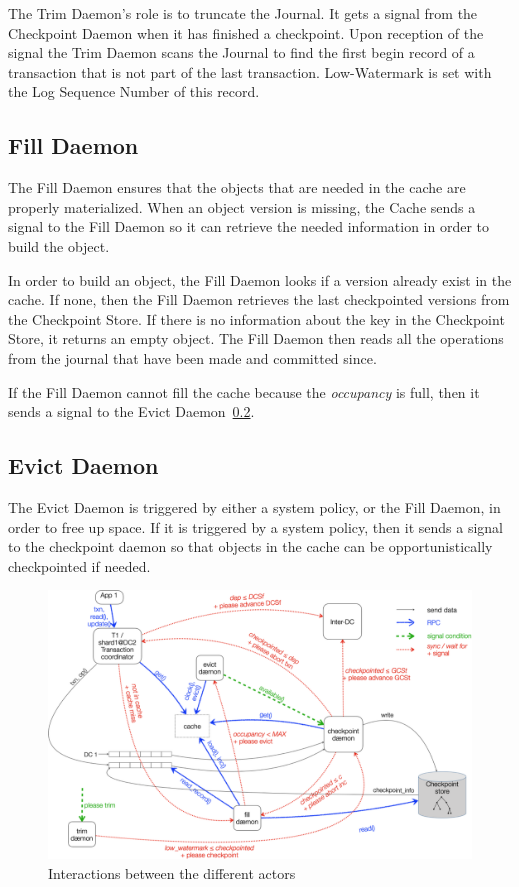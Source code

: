 \documentclass[twoside]{article}
\begin{document}
The Trim Daemon's role is to truncate the Journal. 
It gets a signal from the Checkpoint Daemon when it has finished a checkpoint.
Upon reception of the signal the Trim Daemon scans the Journal to find 
the first begin record of a transaction that is not part of the last transaction.
Low-Watermark is set with the Log Sequence Number of this record.

\subsection{Fill Daemon}
\label{sec:fill-daemon}

The Fill Daemon ensures that the objects that are needed in the cache are properly
materialized. 
When an object version is missing, the Cache sends a signal to the Fill Daemon so it 
can retrieve the needed information in order to build the object.

In order to build an object, the Fill Daemon looks if a version
already exist in the cache. 
If none, then the Fill Daemon retrieves the last checkpointed versions 
from the Checkpoint Store.
If there is no information about the key in the Checkpoint Store, it returns
an empty object.
The Fill Daemon then reads all the operations from the journal that have been made and committed
since.


If the Fill Daemon cannot fill the cache because the \emph{occupancy}
is full, then it sends a signal to the Evict Daemon~\ref{sec:evict-daemon}.

\subsection{Evict Daemon}
\label{sec:evict-daemon}
 
The Evict Daemon is triggered by either a system policy, or the Fill Daemon, in 
order to free up space. 
If it is triggered by a system policy, then it sends a signal to the 
checkpoint daemon so that objects in the cache can be opportunistically
checkpointed if needed.

\begin{figure}[tp]
  \centering
  \includegraphics[width=1\textwidth]{figures/interaction.png}
  \caption{Interactions between the different actors}
  \label{fig:interaction}
\end{figure}
\end{document}
